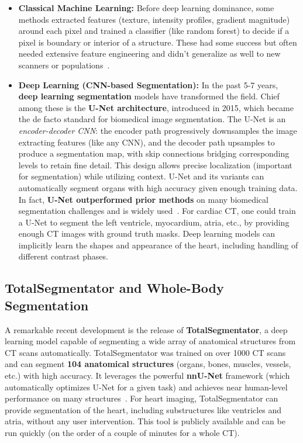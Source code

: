 \documentclass[12pt, BSc]{muthesis}
\begin{document}
\begin{itemize}
\item \textbf{Classical Machine Learning:} Before deep learning dominance, some methods extracted features (texture, intensity profiles, gradient magnitude) around each pixel and trained a classifier (like random forest) to decide if a pixel is boundary or interior of a structure. These had some success but often needed extensive feature engineering and didn’t generalize as well to new scanners or populations~\cite{lei2021mri, Criminisi2011DecisionFF}.

\item \textbf{Deep Learning (CNN-based Segmentation):} In the past 5-7 years, \textbf{deep learning segmentation} models have transformed the field. Chief among these is the \textbf{U-Net architecture}, introduced in 2015, which became the de facto standard for biomedical image segmentation. The U-Net is an \textit{encoder-decoder CNN}: the encoder path progressively downsamples the image extracting features (like any CNN), and the decoder path upsamples to produce a segmentation map, with skip connections bridging corresponding levels to retain fine detail. This design allows precise localization (important for segmentation) while utilizing context. U-Net and its variants can automatically segment organs with high accuracy given enough training data. In fact, \textbf{U-Net outperformed prior methods} on many biomedical segmentation challenges and is widely used~\cite{ronneberger2015unet, Chen2020Deep, bernard2018deep}. For cardiac CT, one could train a U-Net to segment the left ventricle, myocardium, atria, etc., by providing enough CT images with ground truth masks. Deep learning models can implicitly learn the shapes and appearance of the heart, including handling of different contrast phases.
\end{itemize}

\subsection{TotalSegmentator and Whole-Body Segmentation}
A remarkable recent development is the release of \textbf{TotalSegmentator}, a deep learning model capable of segmenting a wide array of anatomical structures from CT scans automatically. TotalSegmentator was trained on over 1000 CT scans and can segment \textbf{104 anatomical structures} (organs, bones, muscles, vessels, etc.) with high accuracy. It leverages the powerful \textbf{nnU-Net} framework (which automatically optimizes U-Net for a given task) and achieves near human-level performance on many structures~\cite{wasserthal2023totalsegmentator, isensee2021nnunet}. For heart imaging, TotalSegmentator can provide segmentation of the heart, including substructures like ventricles and atria, without any user intervention. This tool is publicly available and can be run quickly (on the order of a couple of minutes for a whole CT).
\end{document}

